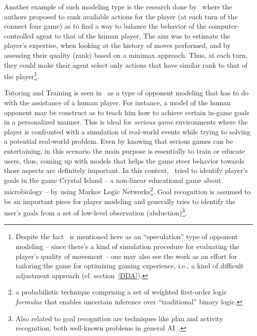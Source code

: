 Another example of such modeling type is the research done by~\cite{missura2008online} where the authors proposed to rank available actions for the player (at each turn of the connect four game) as to find a way to balance the behavior of the computer-controlled agent to that of the human player. The aim was to estimate the player's expertise, when looking at the history of moves performed, and by assessing their quality (rank) based on a minimax approach.  Thus, at each turn, they could make their agent select only actions that have similar rank to that of the player\footnote{Despite the fact~\cite{missura2008online} is mentioned here as an ``speculation'' type of opponent modeling -- since there's a kind of simulation procedure for evaluating the player's quality of movement -- one may also see the work as an effort for tailoring the game for optimizing gaming experience, i.e., a kind of difficult adjustment approach (cf. section~\ref{DDA}).}.

Tutoring and Training is seen in~\cite{Herik_opponentmodelling} as a type of opponent modeling that has to do with the assistance of a human player. For instance,  a model of the human opponent may be construct as to teach him how to achieve certain in-game goals in a personalized manner. This is ideal for \textit{serious game} environments where the player is confronted with a simulation of real-world events while trying to solving a potential real-world problem. Even by knowing that serious games can be entertaining, in this scenario the main purpose is essentially to train or educate users, thus, coming up with models that helps the game steer behavior towards those aspects are definitely important. In this context,~\cite{ha2011goal} tried to identify player's goals in the game Crystal Island -- a non-linear educational game about microbiology -- by using Markov Logic Networks\footnote{a probabilistic technique comprising a set of weighted first-order logic \textit{formulae} that enables uncertain inference over ``traditional'' binary logic. }. Goal recognition is assumed to be an important piece for player modeling and generally tries to identify the user's goals from a set of low-level observation (abduction)\footnote{Also related to goal recognition are techniques like plan and activity recognition, both well-known problems in general AI~\cite{ha2011goal}.}. 

